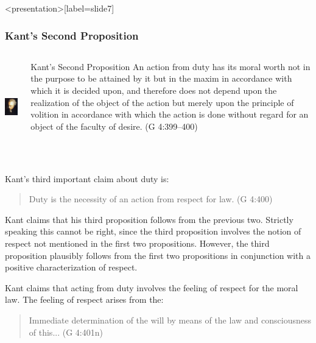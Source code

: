 \begin{frame}<presentation>[label=slide7]
    \frametitle{Kant's Second Proposition}
        \begin{columns}
            \begin{column}{3cm}
                \includegraphics[height=4cm]{../../../graphics/kant.jpg}
            \end{column}
            \begin{column}{7cm}
                \begin{block}{Kant's Second Proposition}
                	An action from duty has its moral worth not in the purpose to be attained by it but in the maxim in accordance with which it is decided upon, and therefore does not depend upon the realization of the object of the action but merely upon the principle of volition in accordance with which the action is done without regard for an object of the faculty of desire. (G 4:399--400)
                \end{block}
                
            \end{column}
        \end{columns}
\end{frame}

Kant's third important claim about duty is:

\begin{quote}
	Duty is the necessity of an action from respect for law. (G 4:400)
\end{quote}

Kant claims that his third proposition follows from the previous two. Strictly speaking this cannot be right, since the third proposition involves the notion of respect not mentioned in the first two propositions. However, the third proposition plausibly follows from the first two propositions in conjunction with a positive characterization of respect.

Kant claims that acting from duty involves the feeling of respect for the moral law. The feeling of respect arises from the:

\begin{quote}
	Immediate determination of the will by means of the law and consciousness of this... (G 4:401n)
\end{quote}

